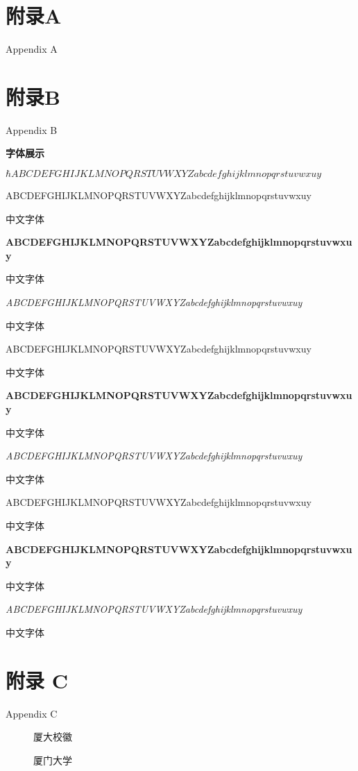 \documentclass[bibstyle=numbers,font=empty]{Settings/XMUthesis}%
\begin{document}
\frontmatter%
\maketitle



\xmutableofcontents
\mainmatter%
\pagestyle{fancy}


\backmatter
\nocite{*} 


\chapter{附录A}{Appendix A}

\chapter{附录B}{Appendix B}

\begin{center}
\textbf{字体展示}
\end{center}

\( \hbar ABCDEFGHIJKLMNOPQRSTUVWXYZabcdefghijklmnopqrstuvwxuy \)


 ABCDEFGHIJKLMNOPQRSTUVWXYZabcdefghijklmnopqrstuvwxuy 
 
 中文字体

{\bfseries ABCDEFGHIJKLMNOPQRSTUVWXYZabcdefghijklmnopqrstuvwxuy 
 
 中文字体}

\itshape ABCDEFGHIJKLMNOPQRSTUVWXYZabcdefghijklmnopqrstuvwxuy 
 
 中文字体

\sffamily ABCDEFGHIJKLMNOPQRSTUVWXYZabcdefghijklmnopqrstuvwxuy 

中文字体

\bfseries ABCDEFGHIJKLMNOPQRSTUVWXYZabcdefghijklmnopqrstuvwxuy 
 
 中文字体
\newpage

\itshape ABCDEFGHIJKLMNOPQRSTUVWXYZabcdefghijklmnopqrstuvwxuy 
 
 中文字体

\ttfamily ABCDEFGHIJKLMNOPQRSTUVWXYZabcdefghijklmnopqrstuvwxuy 

中文字体

\bfseries ABCDEFGHIJKLMNOPQRSTUVWXYZabcdefghijklmnopqrstuvwxuy 
 
 中文字体

\itshape ABCDEFGHIJKLMNOPQRSTUVWXYZabcdefghijklmnopqrstuvwxuy 
 
 中文字体

\chapter{附录 C}{Appendix C}
\begin{figure}[htbp!]
\centering
\caption{厦大校徽}
\xmulogo[0.75]
\end{figure}
\begin{figure}[htbp!]
\centering
\caption{厦门大学}
\xmulogon[0.75]
\end{figure}
\end{document}
